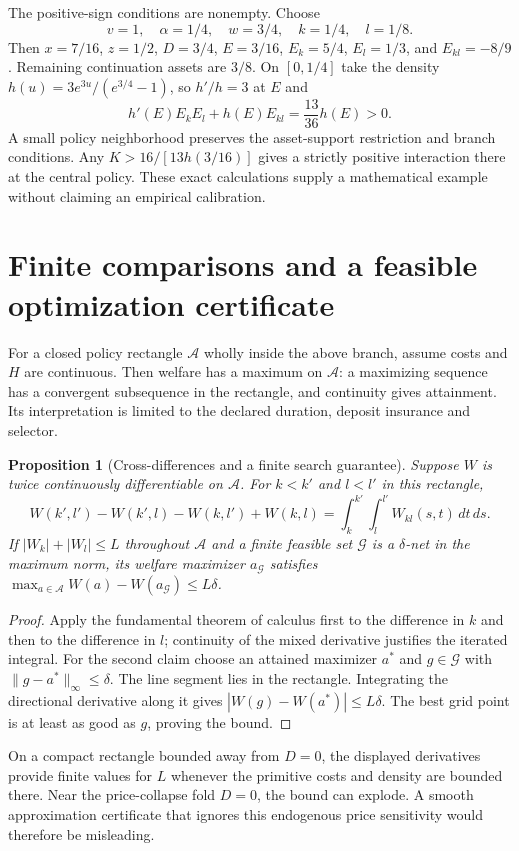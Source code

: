 \documentclass[11pt]{article}
\newtheorem{proposition}[theorem]{Proposition}
\theoremstyle{remark}
\begin{document}
The positive-sign conditions are nonempty. Choose
\[
 v=1,\quad\alpha=1/4,\quad w=3/4,\quad k=1/4,\quad l=1/8.
\]
Then $x=7/16$, $z=1/2$, $D=3/4$, $E=3/16$,
$E_k=5/4$, $E_l=1/3$, and $E_{kl}=-8/9$.
Remaining continuation assets are $3/8$. On $[0,1/4]$ take the density
$h(u)=3e^{3u}/(e^{3/4}-1)$, so $h'/h=3$ at $E$ and
\[
 h'(E)E_kE_l+h(E)E_{kl}=\frac{13}{36}h(E)>0.
\]
A small policy neighborhood preserves the asset-support restriction and
branch conditions. Any $K>16/[13h(3/16)]$ gives a strictly positive
interaction there at the central policy. These exact calculations supply
a mathematical example without claiming an empirical calibration.

\section{Finite comparisons and a feasible optimization certificate}
For a closed policy rectangle $\mathcal A$ wholly inside the above branch,
assume costs and $H$ are continuous. Then welfare has a maximum on
$\mathcal A$: a maximizing sequence has a convergent subsequence in the
rectangle, and continuity gives attainment. Its interpretation is limited
to the declared duration, deposit insurance and selector.

\begin{proposition}[Cross-differences and a finite search guarantee]
Suppose $W$ is twice continuously differentiable on $\mathcal A$.
For $k<k'$ and $l<l'$ in this rectangle,
\[
 W(k',l')-W(k',l)-W(k,l')+W(k,l)
 =\int_k^{k'}\int_l^{l'}W_{kl}(s,t)\,dt\,ds. \tag{10}
\]
If $|W_k|+|W_l|\leq L$ throughout $\mathcal A$ and a finite feasible
set $\mathcal G$ is a $\delta$-net in the maximum norm, its welfare
maximizer $a_\mathcal G$ satisfies
$\max_{a\in\mathcal A}W(a)-W(a_\mathcal G)\leq L\delta$.
\end{proposition}
\begin{proof}
Apply the fundamental theorem of calculus first to the difference in
$k$ and then to the difference in $l$; continuity of the mixed derivative
justifies the iterated integral. For the second claim choose an attained
maximizer $a^*$ and $g\in\mathcal G$ with
$\|g-a^*\|_\infty\leq\delta$. The line segment lies in the rectangle.
Integrating the directional derivative along it gives
$|W(g)-W(a^*)|\leq L\delta$. The best grid point is at least as good
as $g$, proving the bound.
\end{proof}
On a compact rectangle bounded away from $D=0$, the displayed derivatives
provide finite values for $L$ whenever the primitive costs and density
are bounded there. Near the price-collapse fold $D=0$, the bound can
explode. A smooth approximation certificate that ignores this endogenous
price sensitivity would therefore be misleading.
\end{document}
